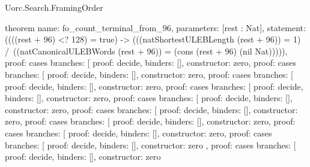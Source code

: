 \begin{lexlean}{Uorc.Search.FramingOrder}
\begin{semanticmodule}
theorem{
  name: fo_count_terminal_from_96,
  parameters: [rest : Nat],
  statement: ((((rest + 96) <? 128) = true) -> (((natShortestULEBLength (rest + 96)) = 1) /\ ((natCanonicalULEBWords (rest + 96)) = (cons (rest + 96) (nil Nat))))),
  proof: cases{
    branches: [
      {proof: decide{}, binders: [], constructor: zero},
      {
        proof: cases{
          branches: [
            {proof: decide{}, binders: [], constructor: zero},
            {
              proof: cases{
                branches: [
                  {proof: decide{}, binders: [], constructor: zero},
                  {
                    proof: cases{
                      branches: [
                        {proof: decide{}, binders: [], constructor: zero},
                        {
                          proof: cases{
                            branches: [
                              {proof: decide{}, binders: [], constructor: zero},
                              {
                                proof: cases{
                                  branches: [
                                    {proof: decide{}, binders: [], constructor: zero},
                                    {
                                      proof: cases{
                                        branches: [
                                          {proof: decide{}, binders: [], constructor: zero},
                                          {
                                            proof: cases{
                                              branches: [
                                                {proof: decide{}, binders: [], constructor: zero},
                                                {
                                                  proof: cases{
                                                    branches: [
                                                      {
                                                        proof: decide{},
                                                        binders: [],
                                                        constructor: zero
                                                      },
                                                      {
                                                        proof: cases{
                                                          branches: [
                                                            {
                                                              proof: decide{},
                                                              binders: [],
                                                              constructor: zero
}}}}}}}}}}}}}}}}}}}}}
\end{semanticmodule}
\end{lexlean}
